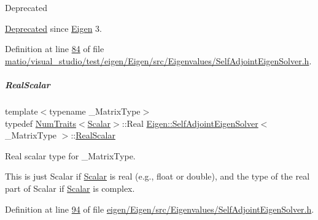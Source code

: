 \begin{DoxyRefDesc}{Deprecated}
\item[\hyperlink{deprecated__deprecated000067}{Deprecated}]since \hyperlink{namespace_eigen}{Eigen} 3. \end{DoxyRefDesc}


Definition at line \hyperlink{matio_2visual__studio_2test_2eigen_2_eigen_2src_2_eigenvalues_2_self_adjoint_eigen_solver_8h_source_l00084}{84} of file \hyperlink{matio_2visual__studio_2test_2eigen_2_eigen_2src_2_eigenvalues_2_self_adjoint_eigen_solver_8h_source}{matio/visual\+\_\+studio/test/eigen/\+Eigen/src/\+Eigenvalues/\+Self\+Adjoint\+Eigen\+Solver.\+h}.

\mbox{\label{group___eigenvalues___module_a5dae5f422a3c71060e6bd31332bf64fd}} 
\subparagraph{\texorpdfstring{Real\+Scalar}{RealScalar}\hspace{0.1cm}{\footnotesize\ttfamily [1/2]}}
{\footnotesize\ttfamily template$<$typename \+\_\+\+Matrix\+Type$>$ \\
typedef \hyperlink{group___core___module_struct_eigen_1_1_num_traits}{Num\+Traits}$<$\hyperlink{group___eigenvalues___module_a0bfcedf4245b6846007ca4f01e4feb1f}{Scalar}$>$\+::Real \hyperlink{group___eigenvalues___module_class_eigen_1_1_self_adjoint_eigen_solver}{Eigen\+::\+Self\+Adjoint\+Eigen\+Solver}$<$ \+\_\+\+Matrix\+Type $>$\+::\hyperlink{group___eigenvalues___module_a5dae5f422a3c71060e6bd31332bf64fd}{Real\+Scalar}}



Real scalar type for {\ttfamily \+\_\+\+Matrix\+Type}. 

This is just {\ttfamily Scalar} if \hyperlink{group___eigenvalues___module_a0bfcedf4245b6846007ca4f01e4feb1f}{Scalar} is real (e.\+g., {\ttfamily float} or {\ttfamily double}), and the type of the real part of {\ttfamily Scalar} if \hyperlink{group___eigenvalues___module_a0bfcedf4245b6846007ca4f01e4feb1f}{Scalar} is complex. 

Definition at line \hyperlink{eigen_2_eigen_2src_2_eigenvalues_2_self_adjoint_eigen_solver_8h_source_l00094}{94} of file \hyperlink{eigen_2_eigen_2src_2_eigenvalues_2_self_adjoint_eigen_solver_8h_source}{eigen/\+Eigen/src/\+Eigenvalues/\+Self\+Adjoint\+Eigen\+Solver.\+h}.

